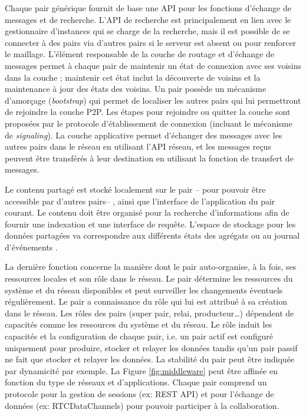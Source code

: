 Chaque pair générique fournit de base une \gls{API} pour les fonctions d'échange 
de messages et de recherche. 
L'\gls{API} de recherche est principalement en lien avec le 
gestionnaire d'instances qui se charge de la recherche, mais il est possible de se 
connecter à des pairs via d'autres pairs si le serveur est absent ou pour renforcer 
le maillage.
L'élément responsable de la couche de routage et d'échange de messages permet 
à chaque pair de maintenir un état de connexion avec ses voisins dans la couche 
; maintenir cet état inclut la découverte de voisins et la maintenance  à jour des 
états des voisins.
Un pair possède un mécanisme d'amorçage (\textit{bootstrap}) qui permet de 
localiser les autres pairs qui lui permettront de rejoindre la couche \gls{P2P}. Les 
étapes pour rejoindre ou quitter la couche sont proposées par le protocole 
d'établissement de connexion (incluant le mécanisme de \textit{signaling}).
La couche applicative permet d'échanger des messages avec les autres pairs 
dans le réseau en utilisant l'\gls{API} réseau, et les messages reçus peuvent être 
transférés à leur destination en utilisant la fonction de transfert de messages. 

Le contenu partagé est stocké localement sur le pair -- pour pouvoir être 
accessible par d'autres pairs-- , ainsi que l'interface de l'application du pair courant. 
Le contenu doit être organisé pour la recherche d'informations afin de fournir une 
indexation et une interface de requête. 
L'espace de stockage pour les données partagées va correspondre aux différents 
états des agrégats \cite{Desprat2015a,Desprat2015b} ou au journal d'événements 
\cite{Desprat2016,Desprat2017}.


La dernière fonction concerne la manière dont le pair auto-organise, à la fois, ses 
ressources locales et son rôle dans le réseau. Le pair détermine les 
ressources du système et du réseau disponibles et peut surveiller les 
changements éventuels régulièrement.
Le pair a connaissance du rôle qui lui est attribué à sa création dans le réseau. 
Les rôles des pairs (super pair, relai, producteur\dots) dépendent de 
capacités comme les ressources du système et du réseau. Le rôle induit les 
capacités et la configuration de chaque pair, i.e. un pair actif est configuré 
uniquement pour produire, stocker et relayer les données tandis qu'un pair passif 
ne fait que stocker et relayer les données. La stabilité du pair peut être indiquée 
par dynamicité par exemple. 
La Figure \ref{fig:middleware} peut être affinée en fonction du type de 
réseaux et d'applications. Chaque pair comprend un protocole pour la gestion
de sessions (ex: REST API) et pour l'échange de données (ex: RTCDataChannels)  
pour pouvoir participer à la collaboration.



